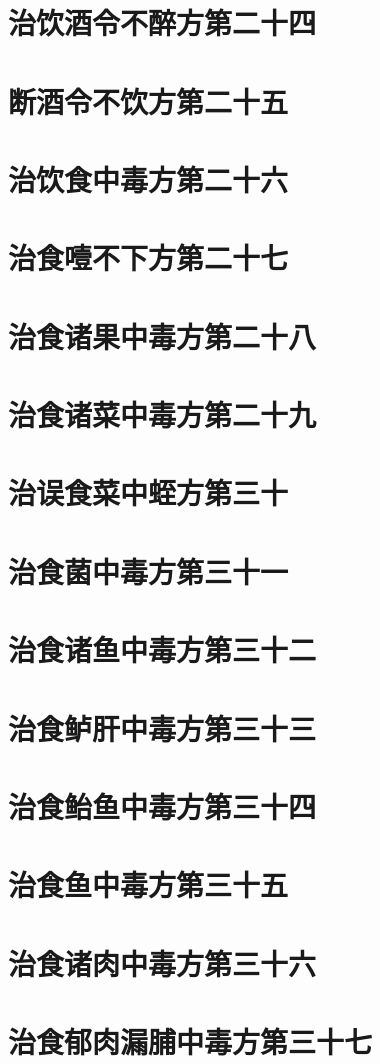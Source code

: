 \documentclass[a4paper,12pt,UTF8,twoside]{ctexbook}
\begin{document}
\chapter{治饮酒令不醉方第二十四}
\chapter{断酒令不饮方第二十五}
\chapter{治饮食中毒方第二十六}
\chapter{治食噎不下方第二十七}
\chapter{治食诸果中毒方第二十八}
\chapter{治食诸菜中毒方第二十九}
\chapter{治误食菜中蛭方第三十}
\chapter{治食菌中毒方第三十一}
\chapter{治食诸鱼中毒方第三十二}
\chapter{治食鲈肝中毒方第三十三}
\chapter{治食鲐鱼中毒方第三十四}
\chapter{治食鱼中毒方第三十五}
\chapter{治食诸肉中毒方第三十六}
\chapter{治食郁肉漏脯中毒方第三十七}
\end{document}
